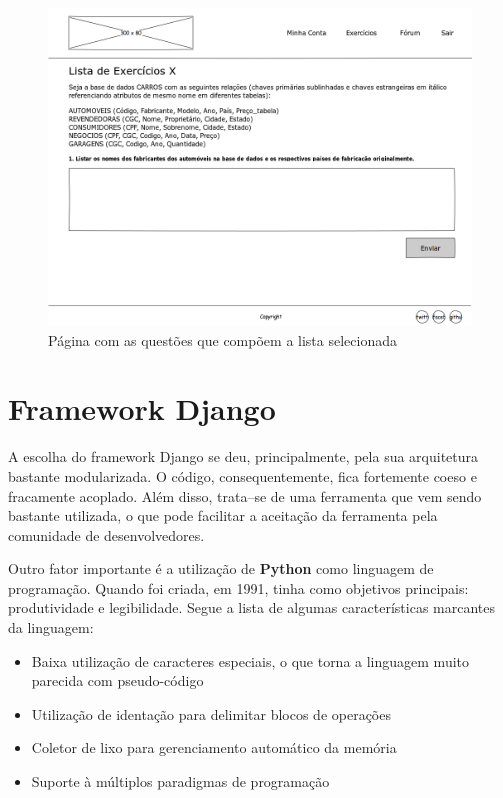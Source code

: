 \documentclass[graduacao,brazil]{ThesisPUC}
\begin{document}
\begin{figure}[H]
    \centering
    \includegraphics[width=\linewidth]{Imagens/QuestionPage.png}
    \caption{P\'{a}gina com as quest\~{o}es que comp\~{o}em a lista selecionada}
\end{figure}


\section{Framework Django}

A escolha do framework Django \cite{Django} se deu, principalmente, pela sua arquitetura bastante modularizada.
O c\'{o}digo, consequentemente, fica fortemente coeso e fracamente acoplado. Al\'{e}m disso, trata--se
de uma ferramenta que vem sendo bastante utilizada, o que pode facilitar
a aceita\c{c}\~{a}o da ferramenta pela comunidade de desenvolvedores.

Outro fator importante \'{e} a utiliza\c{c}\~{a}o de \textbf{Python} como linguagem de programa\c{c}\~{a}o. Quando foi
criada, em 1991, tinha como objetivos principais: produtividade e legibilidade. Segue a lista de algumas caracter\'{i}sticas
marcantes da linguagem:

\begin{itemize}
  \item Baixa utiliza\c{c}\~{a}o de caracteres especiais, o que torna a linguagem muito parecida com pseudo-c\'{o}digo
  \item Utiliza\c{c}\~{a}o de identa\c{c}\~{a}o para delimitar blocos de opera\c{c}\~{o}es
  \item Coletor de lixo para gerenciamento autom\'{a}tico da mem\'{o}ria
  \item Suporte \`{a} m\'{u}ltiplos paradigmas de programa\c{c}\~{a}o
\end{itemize}
\end{document}
